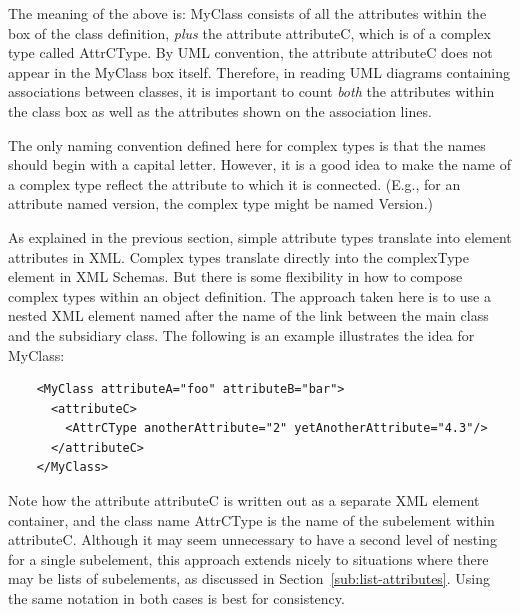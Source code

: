 \documentclass[10pt]{article}
\newcommand{\tightspacing}{\renewcommand{\baselinestretch}{0.85}}
\newcommand{\regularspacing}{\renewcommand{\baselinestretch}{1.0}}
\newcommand{\class}[1]{\textsf{#1}}
\newcommand{\attrib}[1]{\textsf{#1}}
\begin{document}
The meaning of the above is: \class{MyClass} consists of all the attributes
within the box of the class definition, \emph{plus} the attribute
\attrib{attributeC}, which is of a complex type called \class{AttrCType}.
By UML convention, the attribute \attrib{attributeC} does not appear in the
\class{MyClass} box itself.  Therefore, in reading UML diagrams containing
associations between classes, it is important to count \emph{both} the
attributes within the class box as well as the attributes shown on the
association lines.

The only naming convention defined here for complex types is that the names
should begin with a capital letter.  However, it is a good idea to make the
name of a complex type reflect the attribute to which it is connected.
(E.g., for an attribute named \attrib{version}, the complex type might be
named \class{Version}.)

As explained in the previous section, simple attribute types translate into
element attributes in XML.  Complex types translate directly into the
\attrib{complexType} element in XML Schemas.  But there is some flexibility
in how to compose complex types within an object definition.  The approach
taken here is to use a nested XML element named after the name of the link
between the main class and the subsidiary class.  The following is an
example illustrates the idea for \class{MyClass}:
\begin{small}
  \tightspacing
\begin{verbatim}
    <MyClass attributeA="foo" attributeB="bar">
      <attributeC>
        <AttrCType anotherAttribute="2" yetAnotherAttribute="4.3"/>
      </attributeC>
    </MyClass>
\end{verbatim}
  \regularspacing
\end{small}
Note how the attribute \attrib{attributeC} is written out as a separate XML
element container, and the class name \class{AttrCType} is the name of the
subelement within \attrib{attributeC}.  Although it may seem unnecessary to
have a second level of nesting for a single subelement, this approach
extends nicely to situations where there may be lists of subelements, as
discussed in Section~\ref{sub:list-attributes}.  Using the same notation in
both cases is best for consistency.
\end{document}
